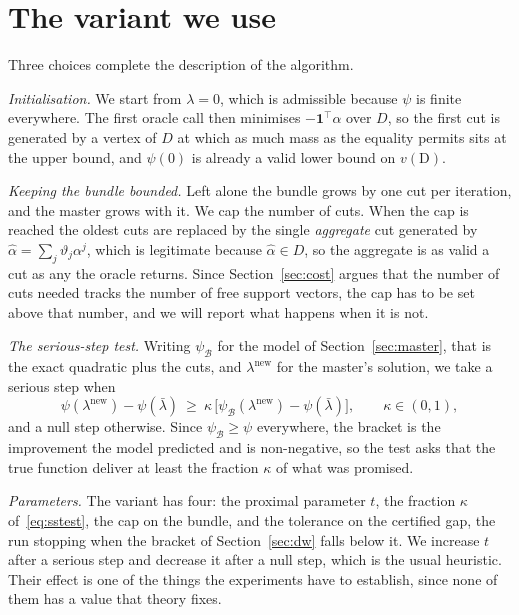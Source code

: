 \documentclass[11pt,a4paper]{report}
\newcommand{\one}{\mathbf{1}}
\begin{document}
\section{The variant we use}
\label{sec:variant}
Three choices complete the description of the algorithm.

\emph{Initialisation.} We start from $\lambda=0$, which is admissible because $\psi$
is finite everywhere. The first oracle call then minimises $-\one^{\!\top}\alpha$
over $D$, so the first cut is generated by a vertex of $D$ at which as much mass as
the equality permits sits at the upper bound, and $\psi(0)$ is already a valid lower
bound on $v(\mathrm{D})$.

\emph{Keeping the bundle bounded.} Left alone the bundle grows by one cut per
iteration, and the master grows with it. We cap the number of cuts. When the cap is
reached the oldest cuts are replaced by the single \emph{aggregate} cut generated by
$\hat\alpha=\sum_j\vartheta_j\alpha^j$, which is legitimate because
$\hat\alpha\in D$, so the aggregate is as valid a cut as any the oracle returns.
Since Section~\ref{sec:cost} argues that the number of cuts needed tracks the number
of free support vectors, the cap has to be set above that number, and we will report
what happens when it is not.

\emph{The serious-step test.} Writing $\psi_{\mathcal B}$ for the model of
Section~\ref{sec:master}, that is the exact quadratic plus the cuts, and
$\lambda^{\mathrm{new}}$ for the master's solution, we take a serious step when
\begin{equation}
\label{eq:sstest}
\psi(\lambda^{\mathrm{new}})-\psi(\bar\lambda)\ \ge\
\kappa\,\bigl[\psi_{\mathcal B}(\lambda^{\mathrm{new}})-\psi(\bar\lambda)\bigr],
\qquad \kappa\in(0,1),
\end{equation}
and a null step otherwise. Since $\psi_{\mathcal B}\ge\psi$ everywhere, the bracket is
the improvement the model predicted and is non-negative, so the test asks that the
true function deliver at least the fraction $\kappa$ of what was promised.

\emph{Parameters.} The variant has four: the proximal parameter $t$, the fraction
$\kappa$ of~\eqref{eq:sstest}, the cap on the bundle, and the tolerance on the
certified gap, the run stopping when the bracket of Section~\ref{sec:dw} falls below
it. We increase $t$ after a serious step and decrease it after a null step, which is
the usual heuristic. Their effect is one of the things the
experiments have to establish, since none of them has a value that theory fixes.
\end{document}
